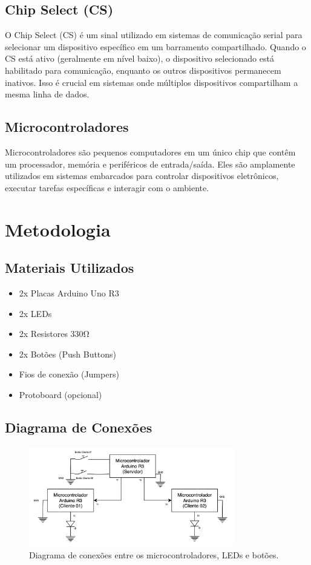 \documentclass[12pt, a4paper]{article}
\begin{document}
\subsection{Chip Select (CS)}
O Chip Select (CS) é um sinal utilizado em sistemas de comunicação serial para selecionar um dispositivo específico em um barramento compartilhado. Quando o CS está ativo (geralmente em nível baixo), o dispositivo selecionado está habilitado para comunicação, enquanto os outros dispositivos permanecem inativos. Isso é crucial em sistemas onde múltiplos dispositivos compartilham a mesma linha de dados.
\subsection{Microcontroladores}
Microcontroladores são pequenos computadores em um único chip que contêm um processador, memória e periféricos de entrada/saída. Eles são amplamente utilizados em sistemas embarcados para controlar dispositivos eletrônicos, executar tarefas específicas e interagir com o ambiente.

\section{Metodologia}
\subsection{Materiais Utilizados}
\begin{itemize}
	\item 2x Placas Arduino Uno R3
	\item 2x LEDs
	\item 2x Resistores 330Ω
	\item 2x Botões (Push Buttons)
	\item Fios de conexão (Jumpers)
	\item Protoboard (opcional)
\end{itemize}

\subsection{Diagrama de Conexões}
\begin{figure}[H]
	\centering
	\includegraphics[width=0.8\textwidth]{diagrama_conexoes.png}
	\caption{Diagrama de conexões entre os microcontroladores, LEDs e botões.}
	\label{fig:diagrama_conexoes}
\end{figure}
\end{document}
